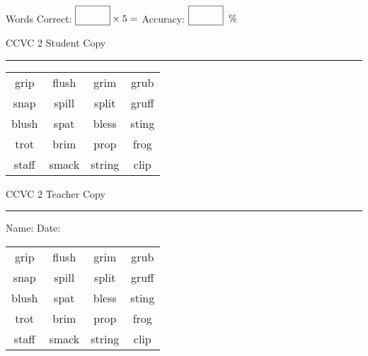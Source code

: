 \documentclass{memoir}
\begin{document}
\normalsize

Words Correct: $\fbox{\phantom{\huge 100}} \times 5 = $ Accuracy: $\fbox{\phantom{\huge 100}}\;\; \%$ 

\vfill

\newpage


\footnotesize \noindent
CCVC 2 \hfill Student Copy
\smallskip
\hrule

\Large

\setlength{\tabcolsep}{14pt}
\def\arraystretch{3}

{\selectfont


\begin{vplace}[0.5]
\begin{center}
\begin{tabular}{cccc}
grip      & flush & grim       & grub \\
snap & spill & split & gruff \\
blush & spat            & bless & sting \\
trot & brim      & prop & frog \\
staff            & smack & string & clip \\
\end{tabular}
\end{center}
\end{vplace}

}

\newpage

\footnotesize \noindent
CCVC 2 \hfill Teacher Copy
\smallskip
\hrule

\normalsize

\vfill

\noindent
Name: \underline{\hspace{1.75in}} \hfill Date: \underline{\hspace{1in}}

\Large

{\selectfont


\begin{vplace}[0.5]
\begin{center}
\begin{tabular}{cccc}
grip      & flush & grim       & grub \\
snap & spill & split & gruff \\
blush & spat            & bless & sting \\
trot & brim      & prop & frog \\
staff            & smack & string & clip \\
\end{tabular}
\end{center}
\end{vplace}



}
\end{document}
